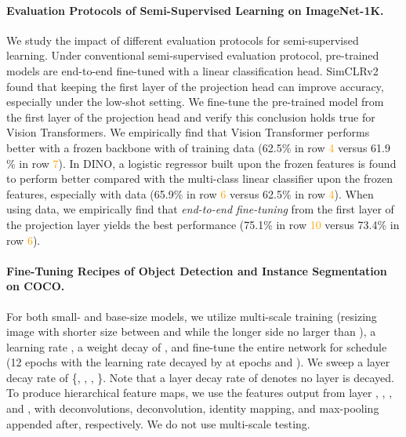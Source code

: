 \documentclass{article} \usepackage{iclr2022_conference,times}
\begin{document}
\paragraph{Evaluation Protocols of Semi-Supervised Learning on ImageNet-1K.} 
We study the impact of different evaluation protocols for semi-supervised learning. 
Under conventional semi-supervised evaluation protocol, pre-trained models are end-to-end fine-tuned with a linear classification head. SimCLRv2 \citet{simclrv2} found that keeping the first layer of the projection head can improve accuracy, especially under the low-shot setting. 
We fine-tune the pre-trained model from the first layer of the projection head and verify this conclusion holds true for Vision Transformers. 
We empirically find that Vision Transformer performs better with a frozen backbone with  of training data (62.5\% in row \textcolor{orange}{4} versus 61.9
\% in row \textcolor{orange}{7}). 
In DINO, a logistic regressor built upon the frozen features is found to perform better compared with the multi-class linear classifier upon the frozen features, especially with  data (65.9\% in row \textcolor{orange}{6} versus 62.5\% in row \textcolor{orange}{4}). 
When using  data, we empirically find that \textit{end-to-end fine-tuning} from the first layer of the projection layer yields the best performance (75.1\% in row \textcolor{orange}{10} versus 73.4\% in row \textcolor{orange}{6}). 


\paragraph{Fine-Tuning Recipes of Object Detection and Instance Segmentation on COCO.} 
For both small- and base-size models, we utilize multi-scale training (resizing image with shorter size between  and  while the longer side no larger than ), a learning rate , a weight decay of , and fine-tune the entire network for  schedule (12 epochs with the learning rate decayed by  at epochs  and ). 
We sweep a layer decay rate of \{, , , \}. Note that a layer decay rate of  denotes no layer is decayed.
To produce hierarchical feature maps, we use the features output from layer , , , and , with  deconvolutions,  deconvolution, identity mapping, and max-pooling appended after, respectively. 
We do not use multi-scale testing.
\end{document}
